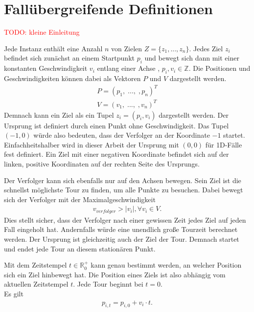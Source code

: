 \documentclass[german,version-2019-11]{uzl-thesis}
\begin{document}
\section{Fallübergreifende Definitionen}
\textcolor{red}{TODO: kleine Einleitung}
\begin{definition} 
\label{def:Ziel}
Jede Instanz enthält eine Anzahl $n$ von Zielen $Z = \{z_1,...,z_n\}$. Jedes Ziel $z_i$ befindet sich zunächst an einem Startpunkt $p_i$ und bewegt sich dann mit einer konstanten Geschwindigkeit $v_i$ entlang einer Achse , $p_i, v_i \in\mathbb{Z}$. Die Positionen und Geschwindigkeiten können dabei als Vektoren $P$ und $V$ dargestellt werden.
\begin{align*}
P = (p_1, \; ..., \; ,p_n)^T \\
V = (v_1, \; ..., \; ,v_n)^T
\end{align*}
Demnach kann ein Ziel als ein Tupel $z_i = (p_i, v_i)$ dargestellt werden. Der Ursprung ist definiert durch einen Punkt ohne Geschwindigkeit. Das Tupel $(-1,0)$ würde also bedeuten, dass der Verfolger an der Koordinate $-1$ startet. Einfachheitshalber wird in dieser Arbeit der Ursprung mit $(0,0)$ für 1D-Fälle fest definiert. Ein Ziel mit einer negativen Koordinate befindet sich auf der linken, positive Koordinaten auf der rechten Seite des Ursprungs. 
\end{definition}

\begin{definition}
Der Verfolger kann sich ebenfalls nur auf den Achsen bewegen. Sein Ziel ist die schnellst möglichste Tour zu finden, um alle Punkte zu besuchen. Dabei bewegt sich der Verfolger mit der Maximalgeschwindigkeit 
\begin{align*}
v_{verfolger} > |v_i|, \forall v_i\in V.
\end{align*}
Dies stellt sicher, dass der Verfolger nach einer gewissen Zeit jedes Ziel auf jeden Fall eingeholt hat. Andernfalls würde eine unendlich große Tourzeit berechnet werden. Der Ursprung ist gleichzeitig auch der Ziel der Tour. Demnach startet und endet jede Tour an diesem stationären Punkt.
\end{definition}

\begin{definition}
\label{def:UpdatedPos}
Mit dem Zeitstempel $t\in \mathbb{R}^+_0$ kann genau bestimmt werden, an welcher Position sich ein Ziel hinbewegt hat. Die Position eines Ziels ist also abhängig vom aktuellen Zeitstempel $t$. Jede Tour beginnt bei $t=0$. \\
Es gilt
\begin{align*}
p_{i,t} = p_{i,0} + v_i\cdot t.
\end{align*} 
\end{definition}
\end{document}
